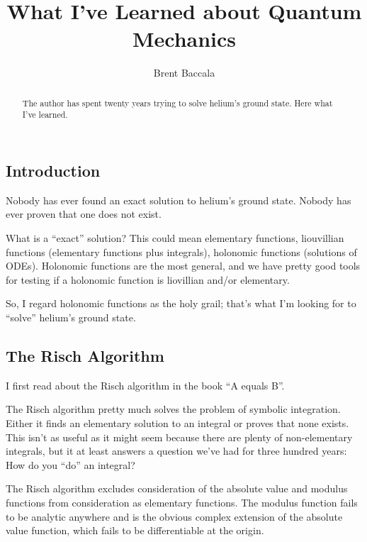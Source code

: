 \documentclass{article}
\title{What I've Learned about Quantum Mechanics}
\author{Brent Baccala}
\begin{document}
\parindent 0pt

\maketitle

\begin{abstract}
The author has spent twenty years trying to solve helium's ground state.
Here what I've learned.
\end{abstract}


\parskip 12pt

\subsection*{Introduction}

Nobody has ever found an exact solution to helium's ground state.
Nobody has ever proven that one does not exist.

What is a ``exact'' solution?  This could mean elementary functions,
liouvillian functions (elementary functions plus integrals), holonomic
functions (solutions of ODEs).  Holonomic functions are the most general,
and we have pretty good tools for testing if a holonomic function is
liovillian and/or elementary.

So, I regard holonomic functions as the holy grail; that's what I'm looking for
to ``solve'' helium's ground state.

\subsection*{The Risch Algorithm}

I first read about the Risch algorithm in the book ``A equals B''.

The Risch algorithm pretty much solves the problem of symbolic integration.
Either it finds an elementary solution to an integral or proves that none exists.
This isn't as useful as it might seem because there are plenty of non-elementary integrals,
but it at least answers a question we've had for three hundred years:
How do you ``do'' an integral?

The Risch algorithm excludes consideration of the absolute value and modulus functions
from consideration as elementary functions.  The modulus function fails to be analytic
anywhere and is the obvious complex extension of the absolute value function, which
fails to be differentiable at the origin.
\end{document}
